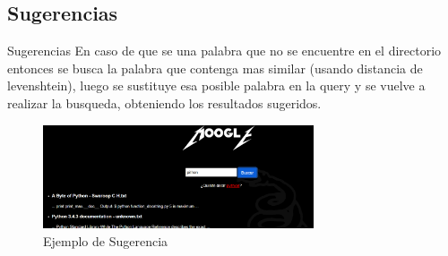 \subsection{Sugerencias}
\begin{frame}[fragile]{Sugerencias}
En caso de que se una palabra que no se encuentre en el directorio entonces se busca
la palabra que contenga mas similar (usando distancia de levenshtein), luego se sustituye esa
posible palabra en la query y se vuelve a realizar la busqueda, obteniendo los
resultados sugeridos.

\begin{figure}[h]
    \center
    \includegraphics[width=8cm]{sugerencia.png}
    \caption{Ejemplo de Sugerencia}
\end{figure}

\end{frame}
